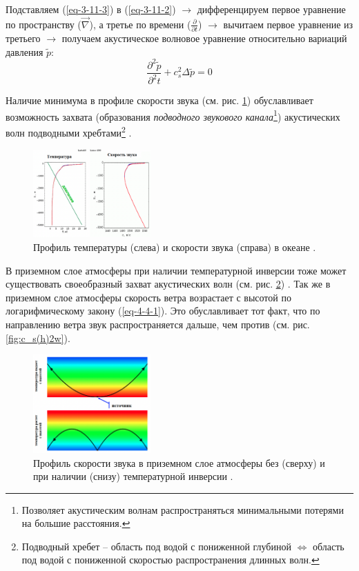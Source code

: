 Подставляем (\ref{eq-3-11-3}) в (\ref{eq-3-11-2}) $\rightarrow$ дифференцируем первое уравнение по пространству ($\vec{\nabla}$), а третье по времени ($\frac{\partial}{\partial t}$) $\rightarrow$ вычитаем первое уравнение из третьего $\rightarrow$ получаем акустическое волновое уравнение относительно вариаций давления $\widetilde{p}$:
\begin{equation}
\frac{\partial^2\widetilde{p}}{\partial^2t}+c_s^2\Delta\widetilde{p}=0
\end{equation}

Наличие минимума в профиле скорости звука (см. рис. \ref{fig:c_s(h)}) обуславливает возможность захвата (образования \textit{подводного звукового канала}\footnote{Позволяет акустическим волнам распространяться минимальными потерями на большие расстояния.}) акустических волн подводными хребтами\footnote{Подводный хребет -- область под водой с пониженной глубиной $\Leftrightarrow$ область под водой с пониженной скоростью распространения длинных волн.} \cite{Носов-2019-14}.

\begin{figure}[!ht]
\centering
\includegraphics[width=0.4\textwidth]{images/c_s(h).png}
\caption{Профиль температуры (слева) и скорости звука (справа) в океане \cite{Носов-2019-14}.}\label{fig:c_s(h)}
\end{figure}

В приземном слое атмосферы при наличии температурной инверсии тоже может существовать своеобразный захват акустических волн (см. рис. \ref{fig:c_s(h)2}) \cite{Носов-2019-14}.
Так же в приземном слое атмосферы скорость ветра возрастает с высотой по логарифмическому закону (\ref{eq-4-4-1}).
Это обуславливает тот факт, что по направлению ветра звук распространяется дальше, чем против (см. рис. \ref{fig:c_s(h)2w}).

\begin{figure}[!ht]
\centering
\includegraphics[width=0.4\textwidth]{images/c_s(h)2.png}
\caption{Профиль скорости звука в приземном слое атмосферы без (сверху) и при наличии (снизу) температурной инверсии \cite{Носов-2019-14}.}\label{fig:c_s(h)2}
\end{figure}

